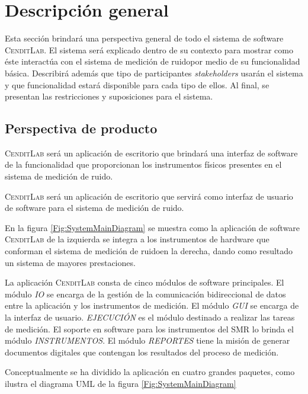 \documentclass[paper=a4,oneside,fontsize=12pt]{article}
\newcommand{\AppName}{\textsc{CenditLab}\xspace}
\newcommand{\smr}{sistema de medición de ruido}
\newcommand{\SMR}{SMR\xspace}
\begin{document}
	\section{Descripción general}
	
	Esta sección brindará una perspectiva general de todo el sistema de software \AppName. El sistema será explicado dentro de su contexto para mostrar como éste interactúa con el \smr por medio de su funcionalidad básica. Describirá además que tipo de participantes \textendash \emph{stakeholders} \textendash usarán el sistema y que funcionalidad estará disponible para cada tipo de ellos. Al final, se presentan las restricciones y suposiciones para el sistema.
	
	\subsection{Perspectiva de producto}
	
	\AppName será un aplicación de escritorio que brindará una interfaz de software de la funcionalidad que proporcionan los instrumentos físicos presentes en el \smr.
	
	\AppName será un aplicación de escritorio que servirá como interfaz de usuario de software para el \smr.
	
	En la figura \ref{Fig:SystemMainDiagram} se muestra como la aplicación de software \AppName de la izquierda se integra a los instrumentos de hardware que conforman el \smr en la derecha, dando como resultado un sistema de mayores prestaciones. 
	
	La aplicación \AppName consta de cinco módulos de software principales. El módulo \emph{IO} se encarga de la gestión de la comunicación bidireccional de datos entre la aplicación y los instrumentos de medición. El módulo \emph{GUI} se encarga de la interfaz de usuario. \emph{EJECUCIÓN} es el módulo destinado a realizar las tareas de medición. El soporte en software para los instrumentos del \SMR lo brinda el módulo \emph{INSTRUMENTOS}. El módulo \emph{REPORTES} tiene la misión de generar documentos digitales que contengan los resultados del proceso de medición.		


		Conceptualmente se ha dividido la aplicación en cuatro grandes paquetes, como ilustra el diagrama UML de la figura \ref{Fig:SystemMainDiagram}
	
\end{document}
